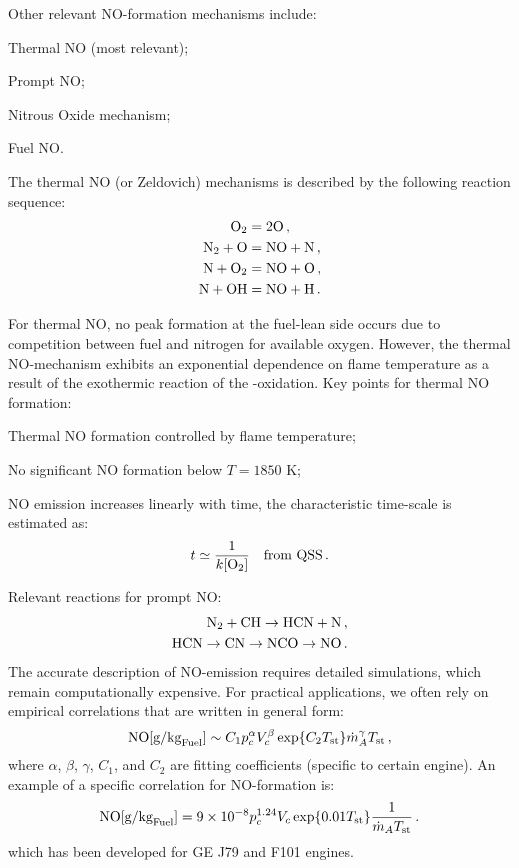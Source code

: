 Other relevant NO-formation mechanisms include:
\begin{itemizePacked}
\item Thermal NO (most relevant);
\item Prompt NO;
\item Nitrous Oxide mechanism;
\item Fuel NO.
\end{itemizePacked}
The thermal NO (or Zeldovich) mechanisms is described by the following reaction sequence:
\[
\begin{split}
  \mathrm{O_2} &= 2 \mathrm{O}\,,\\
  \mathrm{N_2} + \mathrm{O} &= \mathrm{NO} + \mathrm{N}\,,\\
  \mathrm{N} + \mathrm{O_2} &= \mathrm{NO} + \mathrm{O}\,,\\
  \mathrm{N} + \mathrm{OH} &= \mathrm{NO} + \mathrm{H}\,.\\
\end{split}
\]

For thermal NO, no peak formation at the fuel-lean side occurs due to competition between fuel and nitrogen for available oxygen. However, the thermal NO-mechanism exhibits an exponential dependence on flame temperature as a result of the exothermic reaction of the -oxidation. Key points for thermal NO formation:
\begin{itemizePacked}
\item Thermal NO formation controlled by flame temperature;
\item No significant NO formation below $T = 1850$ K;
\item NO emission increases linearly with time, the characteristic time-scale is estimated as:
\begin{equation}
  t \simeq {\frac{1}{k[\ensuremath{\mathrm{O_2}}]}} \quad\text{from QSS}\,.
\end{equation}
\end{itemizePacked}
Relevant reactions for prompt NO:
\[
\begin{split}
  \mathrm{N_2} + \mathrm{CH} \rightarrow \mathrm{HCN} + \mathrm{N}\,,\\
  \mathrm{HCN} \rightarrow \mathrm{CN} \rightarrow \mathrm{NCO} \rightarrow \mathrm{NO}\,.\\
\end{split}
\]
The accurate description of NO-emission requires detailed simulations, which remain computationally expensive. For practical applications, we often rely on empirical correlations that are written in general form:
\begin{equation}
\label{eqn:NO_corr}
  \mathrm{NO} [\text{g/kg}_\text{Fuel}] \sim C_1 p_c^\alpha V_c^\beta \exp\{C_2 T_\text{st}\} \dot{m}_A^\gamma T_\text{st}\,,
\end{equation}
where $\alpha$, $\beta$, $\gamma$, $C_1$, and $C_2$ are fitting coefficients (specific to certain engine). 
An example of a specific correlation for NO-formation is:
\begin{equation}
\label{eqn:NO_corr_2}
  \mathrm{NO} [\text{g/kg}_\text{Fuel}] = 9\times10^{-8} p_c^{1.24} V_c \exp\{0.01 T_\text{st}\} {\frac{1}{\dot{m}_A T_\text{st}}}\,.
\end{equation}
which has been developed for GE J79 and F101 engines.

